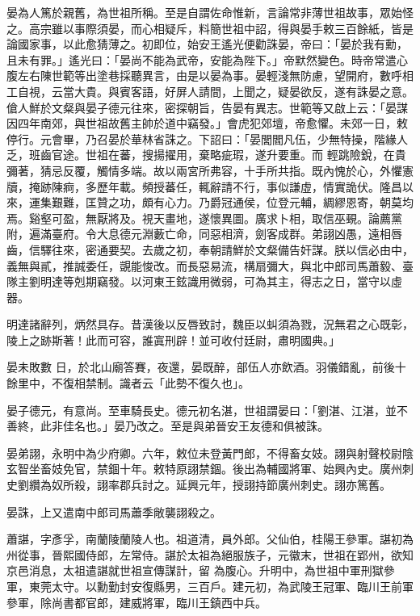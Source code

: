 \begin{pinyinscope}
 晏為人篤於親舊，為世祖所稱。至是自謂佐命惟新，言論常非薄世祖故事，眾始怪之。高宗雖以事際須晏，而心相疑斥，料簡世祖中詔，得與晏手敕三百餘紙，皆是論國家事，以此愈猜薄之。初即位，始安王遙光便勸誅晏，帝曰：「晏於我有勳，且未有罪。」遙光曰：「晏尚不能為武帝，安能為陛下。」帝默然變色。時帝常遣心腹左右陳世範等出塗巷採聽異言，由是以晏為事。晏輕淺無防慮，望開府，數呼相工自視，云當大貴。與賓客語，好屏人請間，上聞之，疑晏欲反，遂有誅晏之意。傖人鮮於文粲與晏子德元往來，密探朝旨，告晏有異志。世範等又啟上云：「晏謀因四年南郊，與世祖故舊主帥於道中竊發。」會虎犯郊壇，帝愈懼。未郊一日，敕停行。元會畢，乃召晏於華林省誅之。下詔曰：「晏閭閻凡伍，少無特操，階緣人乏，班齒官途。世祖在蕃，搜揚擢用，棄略疵瑕，遂升要重。而
 輕跳險銳，在貴彌著，猜忌反覆，觸情多端。故以兩宮所弗容，十手所共指。既內愧於心，外懼憲牘，掩跡陳痾，多歷年載。頻授蕃任，輒辭請不行，事似謙虛，情實詭伏。隆昌以來，運集艱難，匡贊之功，頗有心力。乃爵冠通侯，位登元輔，綢繆恩寄，朝莫均焉。谿壑可盈，無厭將及。視天畫地，遂懷異圖。廣求卜相，取信巫覡。論薦黨附，遍滿臺府。令大息德元淵藪亡命，同惡相濟，劍客成群。弟詡凶愚，遠相唇齒，信驛往來，密通要契。去歲之初，奉朝請鮮於文粲備告奸謀。朕以信必由中，義無與貳，推誠委任，覬能悛改。而長惡易流，構扇彌大，與北中郎司馬蕭毅、臺隊主劉明達等剋期竊發。以河東王鉉識用微弱，可為其主，得志之日，當守以虛器。



 明達諸辭列，炳然具存。昔漢後以反唇致討，魏臣以虯須為戮，況無君之心既彰，陵上之跡斯著！此而可容，誰寘刑辟！並可收付廷尉，肅明國典。」



 晏未敗數
 日，於北山廟答賽，夜還，晏既醉，部伍人亦飲酒。羽儀錯亂，前後十餘里中，不復相禁制。識者云「此勢不復久也」。



 晏子德元，有意尚。至車騎長史。德元初名湛，世祖謂晏曰：「劉湛、江湛，並不善終，此非佳名也。」晏乃改之。至是與弟晉安王友德和俱被誅。



 晏弟詡，永明中為少府卿。六年，敕位未登黃門郎，不得畜女妓。詡與射聲校尉陰玄智坐畜妓免官，禁錮十年。敕特原詡禁錮。後出為輔國將軍、始興內史。廣州刺史劉纘為奴所殺，詡率郡兵討之。延興元年，授詡持節廣州刺史。詡亦篤舊。



 晏誅，上又遣南中郎司馬蕭季敞襲詡殺之。



 蕭諶，字彥孚，南蘭陵蘭陵人也。祖道清，員外郎。父仙伯，桂陽王參軍。諶初為州從事，晉熙國侍郎，左常侍。諶於太祖為絕服族子，元徽末，世祖在郢州，欲知京邑消息，太祖遣諶就世祖宣傳謀計，留
 為腹心。升明中，為世祖中軍刑獄參軍，東莞太守。以勳勤封安復縣男，三百戶。建元初，為武陵王冠軍、臨川王前軍參軍，除尚書都官郎，建威將軍，臨川王鎮西中兵。




\end{pinyinscope}
